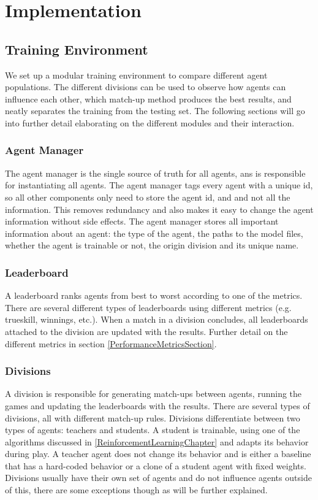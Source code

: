 \chapter{Implementation}

\section{Training Environment}
We set up a modular training environment to compare different agent populations. The different divisions can be used to observe how agents can influence each other, which match-up method produces the best results, and neatly separates the training from the testing set. The following sections will go into further detail elaborating on the different modules and their interaction.

\subsection{Agent Manager}
The agent manager is the single source of truth for all agents, ans is responsible for instantiating all agents. The agent manager tags every agent with a unique id, so all other components only need to store the agent id, and and not all the information. This removes redundancy and also makes it easy to change the agent information without side effects. The agent manager stores all important information about an agent: the type of the agent, the paths to the model files, whether the agent is trainable or not, the origin division and its unique name.

\subsection{Leaderboard}
A leaderboard ranks agents from best to worst according to one of the metrics. There are several different types of leaderboards using different metrics (e.g. trueskill, winnings, etc.). When a match in a division concludes, all leaderboards attached to the division are updated with the results. Further detail on the different metrics in section \ref{PerformanceMetricsSection}.

\subsection{Divisions}
A division is responsible for generating match-ups between agents, running the games and updating the leaderboards with the results. There are several types of divisions, all with different match-up rules.
Divisions differentiate between two types of agents: teachers and students. A student is trainable, using one of the algorithms discussed in \ref{ReinforcementLearningChapter} and adapts its behavior during play. A teacher agent does not change its behavior and is either a baseline that has a hard-coded behavior or a clone of a student agent with fixed weights.
Divisions usually have their own set of agents and do not influence agents outside of this, there are some exceptions though as will be further explained.

